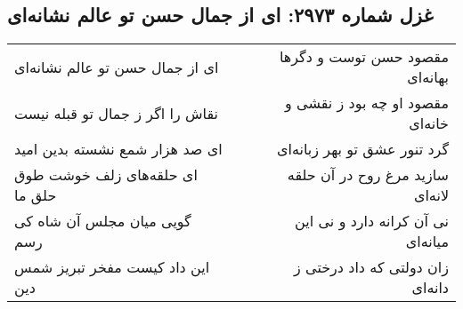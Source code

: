 \begin{center}
\section*{غزل شماره ۲۹۷۳: ای از جمال حسن تو عالم نشانه‌ای}
\label{sec:2973}
\begin{longtable}{l p{0.5cm} r}
ای از جمال حسن تو عالم نشانه‌ای
&&
مقصود حسن توست و دگرها بهانه‌ای
\\
نقاش را اگر ز جمال تو قبله نیست
&&
مقصود او چه بود ز نقشی و خانه‌ای
\\
ای صد هزار شمع نشسته بدین امید
&&
گرد تنور عشق تو بهر زبانه‌ای
\\
ای حلقه‌های زلف خوشت طوق حلق ما
&&
سازید مرغ روح در آن حلقه لانه‌ای
\\
گویی میان مجلس آن شاه کی رسم
&&
نی آن کرانه دارد و نی این میانه‌ای
\\
این داد کیست مفخر تبریز شمس دین
&&
زان دولتی که داد درختی ز دانه‌ای
\\
\end{longtable}
\end{center}
